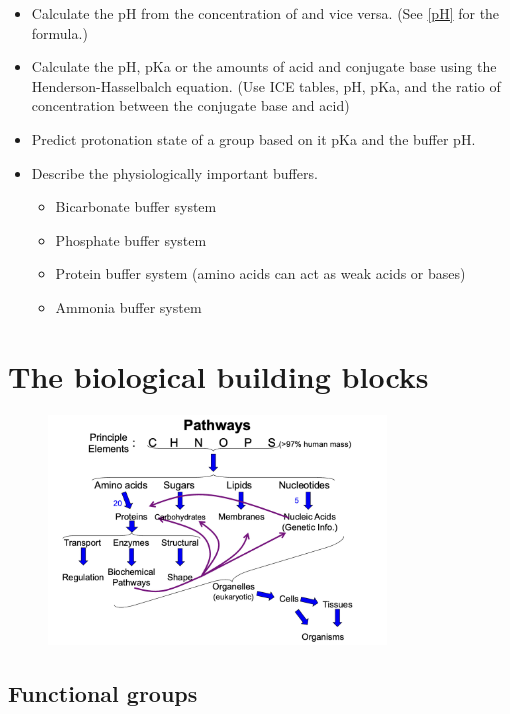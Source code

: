 \documentclass[letterpaper, 12pt]{article}
\begin{document}
\begin{itemize}
\begin{itemize}
\end{itemize}
\item Calculate the pH from the concentration of  and vice versa. (See \ref{pH} for the formula.)
\item Calculate the pH, pKa or the amounts of acid and conjugate base using the Henderson-Hasselbalch equation. (Use ICE tables, pH, pKa, and the ratio of concentration between the conjugate base and acid)
\item Predict protonation state of a group based on it pKa and the buffer pH.
\item Describe the physiologically important buffers.
\begin{itemize}
\item Bicarbonate buffer system 
\item Phosphate buffer system 
\item Protein buffer system (amino acids can act as weak acids or bases)
\item Ammonia buffer system 
\end{itemize}
\end{itemize}

\newpage

\section*{The biological building blocks}

\begin{figure}[H]
\centering
\includegraphics[width=0.8\textwidth]{pathways}
\end{figure}

\subsection*{Functional groups}
\end{document}
